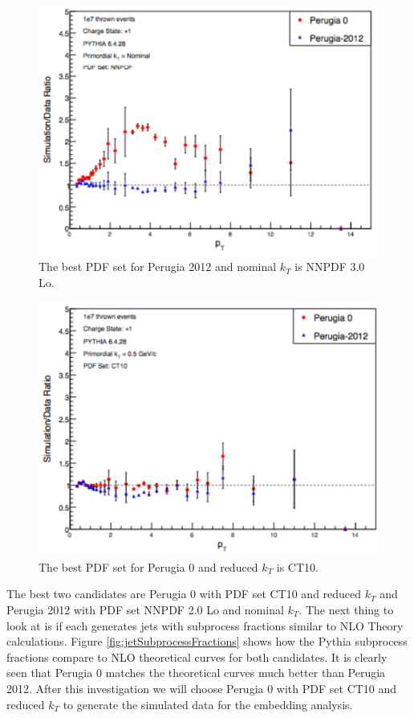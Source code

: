 \documentclass[letterpaper, abstract = on,listof=totoc, bibliography=totoc]{scrreprt}
\begin{document}
\begin{appendices}
\begin{figure}
\begin{center}
\includegraphics[width = .75\textwidth]{nominalKtPDFNNPDFPythTunes}
\caption[]{The best PDF set for Perugia 2012 and nominal $k_T$ is NNPDF 3.0 Lo.}
\label{fig:nominalKtPDFNNPDFPythTunes}
\end{center}
\end{figure}


\begin{figure}
\begin{center}
\includegraphics[width = .75\textwidth]{CT10PythTunes2}
\caption[]{The best PDF set for Perugia 0 and reduced $k_T$ is CT10.}
\label{fig:CT10PythTunes2}
\end{center}
\end{figure}

The best two candidates are Perugia 0 with PDF set CT10 and reduced $k_T$ and Perugia 2012 with PDF set NNPDF 2.0 Lo and nominal $k_T$.  The next thing to look at is if each generates jets with subprocess fractions similar to NLO Theory calculations. Figure \ref{fig:jetSubprocessFractions} shows how the Pythia subprocess fractions compare to NLO theoretical curves for both candidates. It is clearly seen that Perugia 0 matches the theoretical curves much better than Perugia 2012. After this investigation we will choose Perugia 0 with PDF set CT10 and reduced $k_T$ to generate the simulated data for the embedding analysis. 


\end{appendices}
\end{document}
